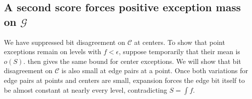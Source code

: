 \subsection{\texorpdfstring{A second score forces positive exception mass on $\mathcal G$}{A second score forces positive exception mass on G}}\label{sec:rare-positive-proof}

We have suppressed bit disagreement on $\mathcal C$ at centers. To show that point exceptions
remain on levels with $f<\epsilon$, suppose temporarily that their mean is \(o(S)\).
 then gives the same bound for center exceptions. We will
show that bit disagreement on $\mathcal C$ is also small at edge pairs at a point. Once both
variations for edge pairs at points and centers are small, expansion forces the edge bit itself to
be almost constant at nearly every level, contradicting \(S=\int f\).

